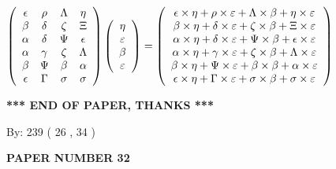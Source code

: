 \documentclass[12pt]{article}
\begin{document}
$  %
 \left( \begin{array}
 {
 c
 c
 c
 c
 }
 \epsilon & 
 \rho & 
 \Lambda & 
 \eta \\ 
 \beta & 
 \delta & 
                    \zeta & 
                    \Xi \\ 
 \alpha & 
 \delta & 
 \Psi & 
 \epsilon \\ 
 \alpha & 
 \gamma & 
                    \zeta & 
 \Lambda \\ 
 \beta & 
 \Psi & 
 \beta & 
 \alpha \\ 
 \epsilon & 
 \Gamma & 
 \sigma & 
 \sigma
 \end{array} \right)
 \left( \begin{array}
 {
 c
 }
 \eta \\ 
 \varepsilon \\ 
 \beta \\ 
 \varepsilon
 \end{array} \right)
=
 \left( \begin{array}
 {
 c
 }
  \epsilon \times  \eta +  \rho \times  \varepsilon +  \Lambda \times  \beta +  \eta \times  \varepsilon \\ 
  \beta \times  \eta +  \delta \times  \varepsilon +                     \zeta \times  \beta +                     \Xi \times  \varepsilon \\ 
  \alpha \times  \eta +  \delta \times  \varepsilon +  \Psi \times  \beta +  \epsilon \times  \varepsilon \\ 
  \alpha \times  \eta +  \gamma \times  \varepsilon +                     \zeta \times  \beta +  \Lambda \times  \varepsilon \\ 
  \beta \times  \eta +  \Psi \times  \varepsilon +  \beta \times  \beta +  \alpha \times  \varepsilon \\ 
  \epsilon \times  \eta +  \Gamma \times  \varepsilon +  \sigma \times  \beta +  \sigma \times  \varepsilon
 \end{array} \right)
$
 
   
   
   
   
\vspace{1.0in} 
{\textbf{\large{ *** END OF PAPER, THANKS *** }}} 
   
   
\hspace{1.0in} By: 
         239 (          26 ,           34 )
   
   
   
   
\newpage 
\setcounter{page}{ 
    32001 } 
   
   
 {\textbf{ \Large{ PAPER NUMBER           32  }}}
   
\end{document}
